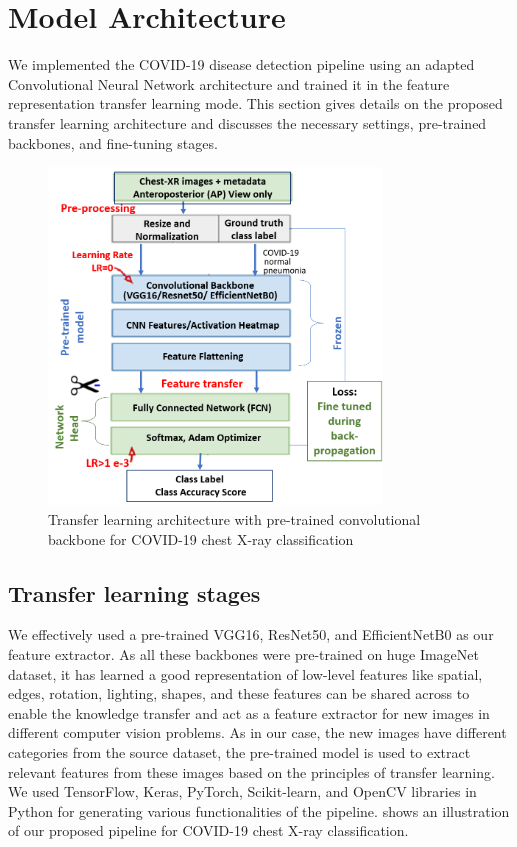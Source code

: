 \section{Model Architecture}
\label{sec:Methods}
We implemented the COVID-19 disease detection pipeline using an adapted Convolutional Neural Network architecture and trained it in the feature representation transfer learning mode. This section gives details on the proposed transfer learning architecture and discusses the necessary settings, pre-trained backbones, and fine-tuning stages.

 
\begin{figure}
\centering
\includegraphics[width=0.79\textwidth]{images/Architecture_covid19.png}
   \caption{Transfer learning architecture with pre-trained convolutional backbone for COVID-19 chest X-ray classification}
\label{fig:architecture}

\end{figure}

\subsection{Transfer learning stages}
 We effectively used a pre-trained  VGG16, ResNet50, and EfficientNetB0 as our feature extractor. As all these backbones were pre-trained on huge ImageNet dataset, it has learned a good representation of low-level features like spatial, edges, rotation, lighting, shapes, and these features can be shared across to enable the knowledge transfer and act as a feature extractor for new images in different computer vision problems.  As in our case, the new images have different categories from the source dataset, the pre-trained model is used to extract relevant features from these images based on the principles of transfer learning. We used TensorFlow, Keras, PyTorch, Scikit-learn, and OpenCV libraries in Python for generating various functionalities of the pipeline.  shows an illustration of our proposed pipeline for COVID-19 chest X-ray classification.
 



